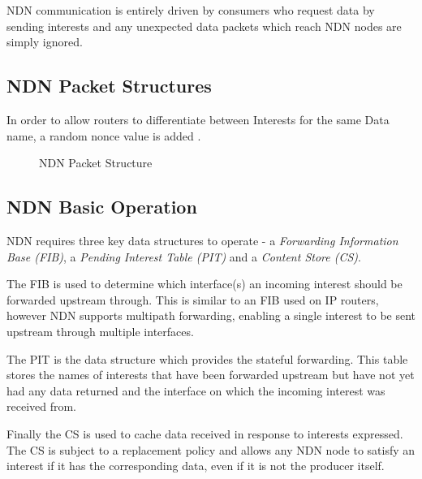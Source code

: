 NDN communication is entirely driven by consumers who request data by sending interests and any unexpected data packets which reach NDN nodes are simply ignored.

\subsection{NDN Packet Structures}
In order to allow routers to differentiate between Interests for the same Data name, a random nonce value is added \cite{vj-named-content}.
\begin{figure}[H]
    \caption{NDN Packet Structure \cite{ndn}}
    \centering
    \label{fig:ndn-packet-structure}
\end{figure}


\subsection{NDN Basic Operation}\label{sec:ndn-basic-operation}
NDN requires three key data structures to operate - a \textit{Forwarding Information Base (FIB)}, a \textit{Pending Interest Table (PIT)} and a \textit{Content Store (CS)}. 

The FIB is used to determine which interface(s) an incoming interest should be forwarded upstream through. This is similar to an FIB used on IP routers, however NDN supports multipath forwarding, enabling a single interest to be sent upstream through multiple interfaces. 

The PIT is the data structure which provides the stateful forwarding. This table stores the names of interests that have been forwarded upstream but have not yet had any data returned and the interface on which the incoming interest was received from.

Finally the CS is used to cache data received in response to interests expressed. The CS is subject to a replacement policy and allows any NDN node to satisfy an interest if it has the corresponding data, even if it is not the producer itself.

